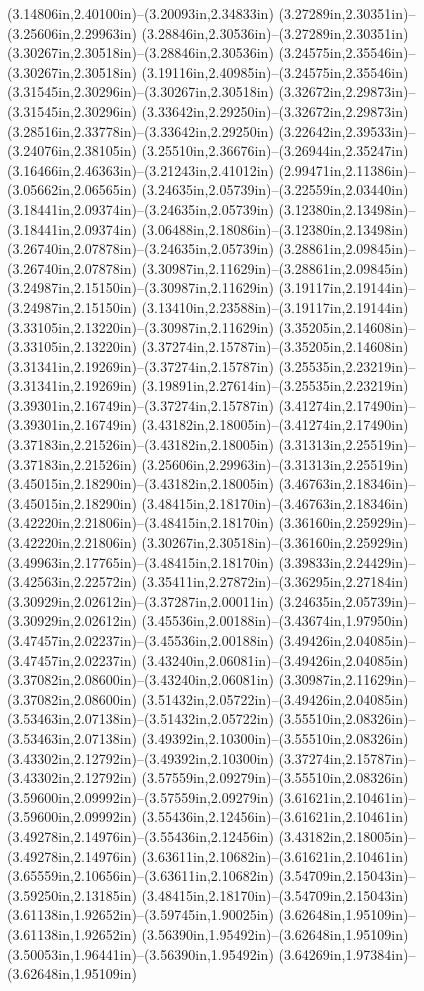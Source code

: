 (3.14806in,2.40100in)--(3.20093in,2.34833in) (3.27289in,2.30351in)--(3.25606in,2.29963in) (3.28846in,2.30536in)--(3.27289in,2.30351in) (3.30267in,2.30518in)--(3.28846in,2.30536in) (3.24575in,2.35546in)--(3.30267in,2.30518in) (3.19116in,2.40985in)--(3.24575in,2.35546in) (3.31545in,2.30296in)--(3.30267in,2.30518in) (3.32672in,2.29873in)--(3.31545in,2.30296in) (3.33642in,2.29250in)--(3.32672in,2.29873in) (3.28516in,2.33778in)--(3.33642in,2.29250in) (3.22642in,2.39533in)--(3.24076in,2.38105in) (3.25510in,2.36676in)--(3.26944in,2.35247in) (3.16466in,2.46363in)--(3.21243in,2.41012in) (2.99471in,2.11386in)--(3.05662in,2.06565in) (3.24635in,2.05739in)--(3.22559in,2.03440in) (3.18441in,2.09374in)--(3.24635in,2.05739in) (3.12380in,2.13498in)--(3.18441in,2.09374in) (3.06488in,2.18086in)--(3.12380in,2.13498in) (3.26740in,2.07878in)--(3.24635in,2.05739in) (3.28861in,2.09845in)--(3.26740in,2.07878in) (3.30987in,2.11629in)--(3.28861in,2.09845in) (3.24987in,2.15150in)--(3.30987in,2.11629in) (3.19117in,2.19144in)--(3.24987in,2.15150in) (3.13410in,2.23588in)--(3.19117in,2.19144in) (3.33105in,2.13220in)--(3.30987in,2.11629in) (3.35205in,2.14608in)--(3.33105in,2.13220in) (3.37274in,2.15787in)--(3.35205in,2.14608in) (3.31341in,2.19269in)--(3.37274in,2.15787in) (3.25535in,2.23219in)--(3.31341in,2.19269in) (3.19891in,2.27614in)--(3.25535in,2.23219in) (3.39301in,2.16749in)--(3.37274in,2.15787in) (3.41274in,2.17490in)--(3.39301in,2.16749in) (3.43182in,2.18005in)--(3.41274in,2.17490in) (3.37183in,2.21526in)--(3.43182in,2.18005in) (3.31313in,2.25519in)--(3.37183in,2.21526in) (3.25606in,2.29963in)--(3.31313in,2.25519in) (3.45015in,2.18290in)--(3.43182in,2.18005in) (3.46763in,2.18346in)--(3.45015in,2.18290in) (3.48415in,2.18170in)--(3.46763in,2.18346in) (3.42220in,2.21806in)--(3.48415in,2.18170in) (3.36160in,2.25929in)--(3.42220in,2.21806in) (3.30267in,2.30518in)--(3.36160in,2.25929in) (3.49963in,2.17765in)--(3.48415in,2.18170in) (3.39833in,2.24429in)--(3.42563in,2.22572in) (3.35411in,2.27872in)--(3.36295in,2.27184in) (3.30929in,2.02612in)--(3.37287in,2.00011in) (3.24635in,2.05739in)--(3.30929in,2.02612in) (3.45536in,2.00188in)--(3.43674in,1.97950in) (3.47457in,2.02237in)--(3.45536in,2.00188in) (3.49426in,2.04085in)--(3.47457in,2.02237in) (3.43240in,2.06081in)--(3.49426in,2.04085in) (3.37082in,2.08600in)--(3.43240in,2.06081in) (3.30987in,2.11629in)--(3.37082in,2.08600in) (3.51432in,2.05722in)--(3.49426in,2.04085in) (3.53463in,2.07138in)--(3.51432in,2.05722in) (3.55510in,2.08326in)--(3.53463in,2.07138in) (3.49392in,2.10300in)--(3.55510in,2.08326in) (3.43302in,2.12792in)--(3.49392in,2.10300in) (3.37274in,2.15787in)--(3.43302in,2.12792in) (3.57559in,2.09279in)--(3.55510in,2.08326in) (3.59600in,2.09992in)--(3.57559in,2.09279in) (3.61621in,2.10461in)--(3.59600in,2.09992in) (3.55436in,2.12456in)--(3.61621in,2.10461in) (3.49278in,2.14976in)--(3.55436in,2.12456in) (3.43182in,2.18005in)--(3.49278in,2.14976in) (3.63611in,2.10682in)--(3.61621in,2.10461in) (3.65559in,2.10656in)--(3.63611in,2.10682in) (3.54709in,2.15043in)--(3.59250in,2.13185in) (3.48415in,2.18170in)--(3.54709in,2.15043in) (3.61138in,1.92652in)--(3.59745in,1.90025in) (3.62648in,1.95109in)--(3.61138in,1.92652in) (3.56390in,1.95492in)--(3.62648in,1.95109in) (3.50053in,1.96441in)--(3.56390in,1.95492in) (3.64269in,1.97384in)--(3.62648in,1.95109in) 